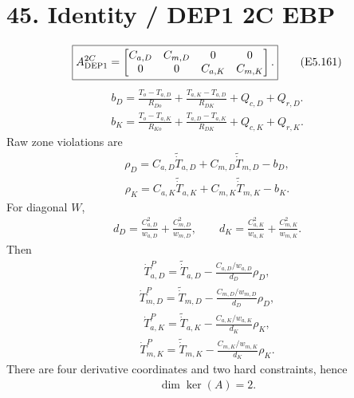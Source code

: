 \documentclass[11pt]{article}
\begin{document}
\section*{45. Identity / DEP1 2C EBP}

\begin{align}
\boxed{A_{\rm DEP1}^{2C}=\begin{bmatrix}C_{a,D}&C_{m,D}&0&0\\0&0&C_{a,K}&C_{m,K}\end{bmatrix}.}
\tag{E5.161}
\end{align}
\begin{align}
\boxed{b_D=\frac{T_o-T_{a,D}}{R_{Do}}+\frac{T_{a,K}-T_{a,D}}{R_{DK}}+Q_{c,D}+Q_{r,D}.}
\tag{E5.162}
\end{align}
\begin{align}
\boxed{b_K=\frac{T_o-T_{a,K}}{R_{Ko}}+\frac{T_{a,D}-T_{a,K}}{R_{DK}}+Q_{c,K}+Q_{r,K}.}
\tag{E5.163}
\end{align}
Raw zone violations are
\begin{align}
\boxed{\rho_D=C_{a,D}\widetilde{\dot T}_{a,D}+C_{m,D}\widetilde{\dot T}_{m,D}-b_D,}
\tag{E5.164}
\end{align}
\begin{align}
\boxed{\rho_K=C_{a,K}\widetilde{\dot T}_{a,K}+C_{m,K}\widetilde{\dot T}_{m,K}-b_K.}
\tag{E5.165}
\end{align}
For diagonal \(W\),
\begin{align}
\boxed{d_D=\frac{C_{a,D}^2}{w_{a,D}}+\frac{C_{m,D}^2}{w_{m,D}},\qquad d_K=\frac{C_{a,K}^2}{w_{a,K}}+\frac{C_{m,K}^2}{w_{m,K}}.}
\tag{E5.166}
\end{align}
Then
\begin{align}
\boxed{\dot T_{a,D}^{P}=\widetilde{\dot T}_{a,D}-\frac{C_{a,D}/w_{a,D}}{d_D}\rho_D,}
\tag{E5.167}
\end{align}
\begin{align}
\boxed{\dot T_{m,D}^{P}=\widetilde{\dot T}_{m,D}-\frac{C_{m,D}/w_{m,D}}{d_D}\rho_D,}
\tag{E5.168}
\end{align}
\begin{align}
\boxed{\dot T_{a,K}^{P}=\widetilde{\dot T}_{a,K}-\frac{C_{a,K}/w_{a,K}}{d_K}\rho_K,}
\tag{E5.169}
\end{align}
\begin{align}
\boxed{\dot T_{m,K}^{P}=\widetilde{\dot T}_{m,K}-\frac{C_{m,K}/w_{m,K}}{d_K}\rho_K.}
\tag{E5.170}
\end{align}
There are four derivative coordinates and two hard constraints, hence
\begin{align}
\boxed{\dim\ker(A)=2.}
\tag{E5.171}
\end{align}
\end{document}
